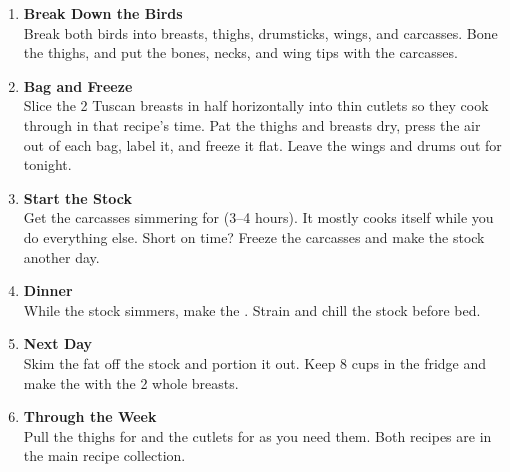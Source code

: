 \begin{enumerate}

      \item \textbf{Break Down the Birds} \\
            Break both birds into breasts, thighs, drumsticks, wings, and carcasses. Bone the thighs, and put the bones, necks, and wing tips with the carcasses.

      \item \textbf{Bag and Freeze} \\
            Slice the 2 Tuscan breasts in half horizontally into thin cutlets so they cook through in that recipe's time. Pat the thighs and breasts dry, press the air out of each bag, label it, and freeze it flat. Leave the wings and drums out for tonight.

      \item \textbf{Start the Stock} \\
            Get the carcasses simmering for  (3--4 hours). It mostly cooks itself while you do everything else. Short on time? Freeze the carcasses and make the stock another day.

      \item \textbf{Dinner} \\
            While the stock simmers, make the . Strain and chill the stock before bed.

      \item \textbf{Next Day} \\
            Skim the fat off the stock and portion it out. Keep 8 cups in the fridge and make the  with the 2 whole breasts.

      \item \textbf{Through the Week} \\
            Pull the thighs for  and the cutlets for  as you need them. Both recipes are in the main recipe collection.

\end{enumerate}



